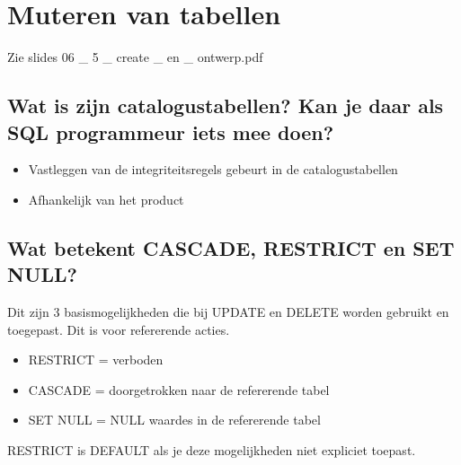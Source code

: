 \newpage

\section{Muteren van tabellen}

Zie slides 06 \_ 5 \_ create \_ en \_ ontwerp.pdf

\subsection{Wat is zijn catalogustabellen? Kan je daar als SQL programmeur iets mee doen?}

\begin{itemize}
\item Vastleggen van de integriteitsregels gebeurt in de catalogustabellen
\item Afhankelijk van het product
\end{itemize}

\subsection{Wat betekent CASCADE, RESTRICT en SET NULL?}

Dit zijn 3 basismogelijkheden die bij UPDATE en DELETE worden gebruikt en toegepast. Dit is voor refererende acties.
\begin{itemize}
\item RESTRICT = verboden
\item CASCADE = doorgetrokken naar de refererende tabel
\item SET NULL = NULL waardes in de refererende tabel
\end{itemize}
RESTRICT is DEFAULT als je deze mogelijkheden niet expliciet toepast.